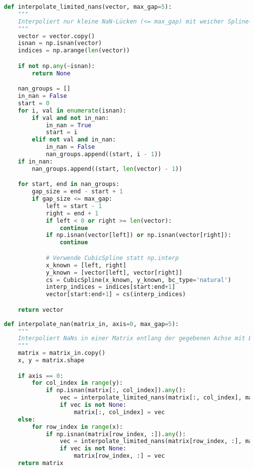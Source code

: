 
\begin{lstlisting}[language=Python, caption={Interpolation begrenzter Lücken in 1D-Profilen}, label={lst:interp-limited-nans}]
def interpolate_limited_nans(vector, max_gap=5):
    """
    Interpoliert nur kleine NaN-Lücken (<= max_gap) mit weicher Spline-Interpolation.
    """
    vector = vector.copy()
    isnan = np.isnan(vector)
    indices = np.arange(len(vector))

    if not np.any(~isnan):
        return None

    nan_groups = []
    in_nan = False
    start = 0
    for i, val in enumerate(isnan):
        if val and not in_nan:
            in_nan = True
            start = i
        elif not val and in_nan:
            in_nan = False
            nan_groups.append((start, i - 1))
    if in_nan:
        nan_groups.append((start, len(vector) - 1))

    for start, end in nan_groups:
        gap_size = end - start + 1
        if gap_size <= max_gap:
            left = start - 1
            right = end + 1
            if left < 0 or right >= len(vector):
                continue
            if np.isnan(vector[left]) or np.isnan(vector[right]):
                continue

            # Verwende CubicSpline statt np.interp
            x_known = [left, right]
            y_known = [vector[left], vector[right]]
            cs = CubicSpline(x_known, y_known, bc_type='natural')
            interp_indices = indices[start:end+1]
            vector[start:end+1] = cs(interp_indices)

    return vector
\end{lstlisting}

\begin{lstlisting}[language=Python, caption={Achsweise Interpolation von NaNs in Matrizen}, label={lst:interp-nan-matrix}]
def interpolate_nan(matrix_in, axis=0, max_gap=5):
    """
    Interpoliert NaNs in einer Matrix entlang der gegebenen Achse mit Begrenzung.
    """
    matrix = matrix_in.copy()
    x, y = matrix.shape

    if axis == 0:
        for col_index in range(y):
            if np.isnan(matrix[:, col_index]).any():
                vec = interpolate_limited_nans(matrix[:, col_index], max_gap=max_gap)
                if vec is not None:
                    matrix[:, col_index] = vec
    else:
        for row_index in range(x):
            if np.isnan(matrix[row_index, :]).any():
                vec = interpolate_limited_nans(matrix[row_index, :], max_gap=max_gap)
                if vec is not None:
                    matrix[row_index, :] = vec
    return matrix
\end{lstlisting}

